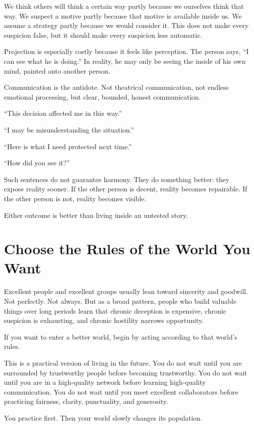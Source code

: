We think others will think a certain way partly because we ourselves think that way. We suspect a motive partly because that motive is available inside us. We assume a strategy partly because we would consider it. This does not make every suspicion false, but it should make every suspicion less automatic.

Projection is especially costly because it feels like perception. The person says, ``I can see what he is doing.'' In reality, he may only be seeing the inside of his own mind, painted onto another person.

Communication is the antidote. Not theatrical communication, not endless emotional processing, but clear, bounded, honest communication.

``This decision affected me in this way.''

``I may be misunderstanding the situation.''

``Here is what I need protected next time.''

``How did you see it?''

Such sentences do not guarantee harmony. They do something better: they expose reality sooner. If the other person is decent, reality becomes repairable. If the other person is not, reality becomes visible.

Either outcome is better than living inside an untested story.

\section*{Choose the Rules of the World You Want}

Excellent people and excellent groups usually lean toward sincerity and goodwill. Not perfectly. Not always. But as a broad pattern, people who build valuable things over long periods learn that chronic deception is expensive, chronic suspicion is exhausting, and chronic hostility narrows opportunity.

If you want to enter a better world, begin by acting according to that world's rules.

This is a practical version of living in the future. You do not wait until you are surrounded by trustworthy people before becoming trustworthy. You do not wait until you are in a high-quality network before learning high-quality communication. You do not wait until you meet excellent collaborators before practicing fairness, clarity, punctuality, and generosity.

You practice first. Then your world slowly changes its population.

